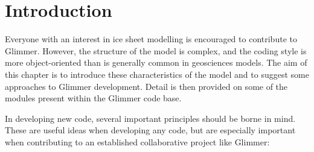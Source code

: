 \section{Introduction}

Everyone with an interest in ice sheet modelling is encouraged to contribute
to Glimmer. However, the structure of the model is complex, and the coding
style is more object-oriented than is generally common in geosciences
models. The aim of this chapter is to introduce these characteristics of the
model and to suggest some approaches to Glimmer development. Detail is then
provided on some of the modules present within the Glimmer code base.

In developing new code, several important principles should be borne in
mind. These are useful ideas when developing any code, but are especially
important when contributing to an established collaborative project like
Glimmer:
